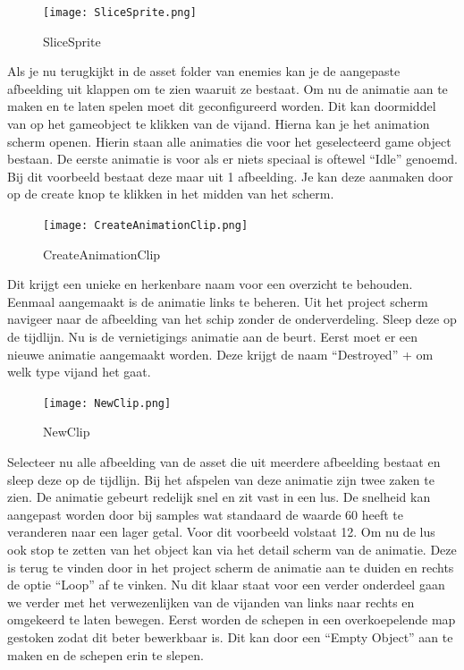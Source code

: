 \begin{figure}[H]
    \centering
    \texttt{[image: SliceSprite.png]}
    \caption{SliceSprite}
    \label{fig:SliceSprite}
\end{figure}
Als je nu terugkijkt in de asset folder van enemies kan je de aangepaste afbeelding uit klappen om te zien waaruit ze bestaat.
Om nu de animatie aan te maken en te laten spelen moet dit geconfigureerd worden. Dit kan doormiddel van op het gameobject te klikken van de vijand. Hierna kan je het animation scherm openen. Hierin staan alle animaties die voor het geselecteerd game object bestaan. De eerste animatie is voor als er niets speciaal is oftewel “Idle” genoemd. Bij dit voorbeeld bestaat deze maar uit 1 afbeelding. Je kan deze aanmaken door op de create knop te klikken in het midden van het scherm. 

\begin{figure}[H]
    \centering
    \texttt{[image: CreateAnimationClip.png]}
    \caption{CreateAnimationClip}
    \label{fig:CreateAnimationClip}
\end{figure}

Dit krijgt een unieke en herkenbare naam voor een overzicht te behouden. Eenmaal aangemaakt is de animatie links te beheren. Uit het project scherm navigeer naar de afbeelding van het schip zonder de onderverdeling. Sleep deze op de tijdlijn.
Nu is de vernietigings animatie aan de beurt. Eerst moet er een nieuwe animatie aangemaakt worden. Deze krijgt de naam “Destroyed” + om welk type vijand het gaat.
\begin{figure}[H]
    \centering
    \texttt{[image: NewClip.png]}
    \caption{NewClip}
    \label{fig:NewClip}
\end{figure}

Selecteer nu alle afbeelding van de asset die uit meerdere afbeelding bestaat en sleep deze op de tijdlijn. Bij het afspelen van deze animatie zijn twee zaken te zien. De animatie gebeurt redelijk snel en zit vast in een lus. De snelheid kan aangepast worden door bij samples wat standaard de waarde 60 heeft te veranderen naar een lager getal. Voor dit voorbeeld volstaat 12. Om nu de lus ook stop te zetten van het object kan via het detail scherm van de animatie. Deze is terug te vinden door in het project scherm de animatie aan te duiden en rechts de optie “Loop” af te vinken.
Nu dit klaar staat voor een verder onderdeel gaan we verder met het verwezenlijken van de vijanden van links naar rechts en omgekeerd te laten bewegen. Eerst worden de schepen in een overkoepelende map gestoken zodat dit beter bewerkbaar is. Dit kan door een “Empty Object” aan te maken en de schepen erin te slepen.

